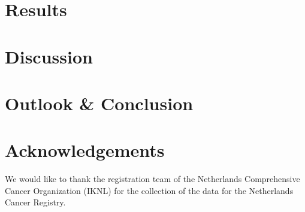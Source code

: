 \documentclass{scrartcl}
\begin{document}
\newpage
\section{Results}\label{sec:results}



\newpage
\section{Discussion}\label{sec:discussion}

\section{Outlook \& Conclusion}\label{sec:outlook_conclusion}

\section{Acknowledgements}
We would like to thank the registration team of the Netherlands Comprehensive Cancer Organization (IKNL) for the collection of the data for the Netherlands Cancer Registry.

\newpage

%
%
%
%

\end{document}
